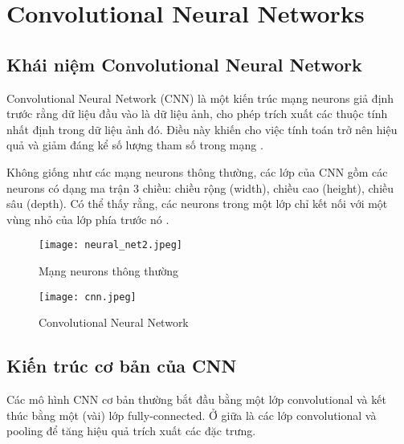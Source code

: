 \documentclass[../thesis.tex]{subfiles}
\begin{document}
\section{Convolutional Neural Networks}

\subsection{Khái niệm Convolutional Neural Network}

Convolutional Neural Network (CNN) là một kiến trúc mạng neurons giả định trước rằng dữ liệu đầu vào là dữ liệu ảnh, cho phép trích xuất các thuộc tính nhất định trong dữ liệu ảnh đó. Điều này khiến cho việc tính toán trở nên hiệu quả và giảm đáng kể số lượng tham số trong mạng \cite{cs231n}.

Không giống như các mạng neurons thông thường, các lớp của CNN gồm các neurons có dạng ma trận 3 chiều: chiều rộng (width), chiều cao (height), chiều sâu (depth). Có thể thấy rằng, các neurons trong một lớp chỉ kết nối với một vùng nhỏ của lớp phía trước nó \cite{cs231n}.
\begin{figure}[!htb]
	\begin{minipage}{0.48\textwidth}
		\centering
		\texttt{[image: neural\_net2.jpeg]}
		\caption{Mạng neurons thông thường}\label{Fig:NN}
	\end{minipage}\hfill
	\begin {minipage}{0.48\textwidth}
		\centering
		\texttt{[image: cnn.jpeg]}
		\caption{Convolutional Neural Network}\label{Fig:CNN}
	\end{minipage}
\end{figure}

\subsection{Kiến trúc cơ bản của CNN}

Các mô hình CNN cơ bản thường bắt đầu bằng một lớp convolutional và kết thúc bằng một (vài) lớp fully-connected. Ở giữa là các lớp convolutional và pooling để tăng hiệu quả trích xuất các đặc trưng.
\end{document}
